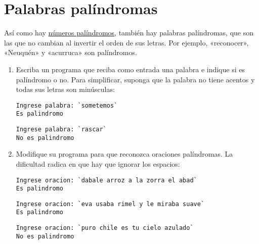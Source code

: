 \section{Palabras palíndromas}

Así como hay \href{es-numero-palindromo.html}{números palíndromos},
también hay palabras palíndromas, que son las que no cambian al invertir
el orden de sus letras.
Por ejemplo, «reconocer», «Neuquén» y «acurruca» son palíndromos.

\begin{enumerate}

  \item
    Escriba un programa que reciba como entrada una palabra e indique si
    es palíndromo o no. Para simplificar, suponga que la palabra no tiene
    acentos y todas sus letras son minúsculas:

\begin{lstlisting}[language=testcase]
Ingrese palabra: `sometemos`
Es palindromo
\end{lstlisting}

\begin{lstlisting}[language=testcase]
Ingrese palabra: `rascar`
No es palindromo
\end{lstlisting}

  \item
    Modifique su programa para que reconozca oraciones palíndromas. La
    dificultad radica en que hay que ignorar los espacios:

\begin{lstlisting}[language=testcase]
Ingrese oracion: `dabale arroz a la zorra el abad`
Es palindromo
\end{lstlisting}

\begin{lstlisting}[language=testcase]
Ingrese oracion: `eva usaba rimel y le miraba suave`
Es palindromo
\end{lstlisting}

\begin{lstlisting}[language=testcase]
Ingrese oracion: `puro chile es tu cielo azulado`
No es palindromo
\end{lstlisting}

\end{enumerate}
